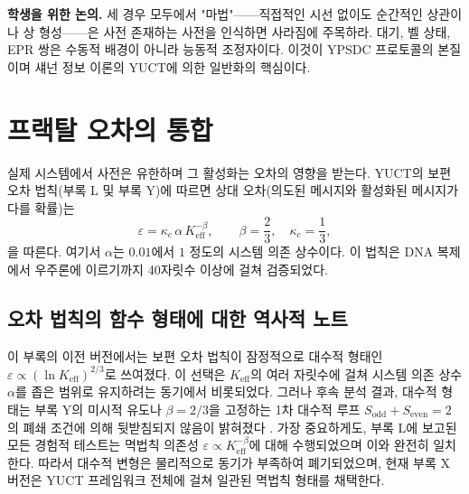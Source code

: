 \documentclass[12pt,a4paper]{article}
\begin{document}
	\vspace{0.2cm}
	\noindent\textbf{학생을 위한 논의.} 
	세 경우 모두에서 "마법"——직접적인 시선 없이도 순간적인 상관이나 상 형성——은 사전 존재하는 사전을 인식하면 사라짐에 주목하라. 대기, 벨 상태, EPR 쌍은 수동적 배경이 아니라 능동적 조정자이다. 이것이 YPSDC 프로토콜의 본질이며 섀넌 정보 이론의 YUCT에 의한 일반화의 핵심이다.
	
	\section{프랙탈 오차의 통합}
	\label{sec:errors}
	
	실제 시스템에서 사전은 유한하며 그 활성화는 오차의 영향을 받는다. YUCT의 보편 오차 법칙(부록 L 및 부록 Y)에 따르면 상대 오차(의도된 메시지와 활성화된 메시지가 다를 확률)는
	\begin{equation}
		\boxed{\varepsilon = \kappa_c \, \alpha \, K_{\mathrm{eff}}^{-\beta}}, \qquad 
		\beta = \frac{2}{3},\quad \kappa_c = \frac{1}{3},
		\label{eq:error-law-corrected}
	\end{equation}
	을 따른다. 여기서 $\alpha$는 $0.01$에서 $1$ 정도의 시스템 의존 상수이다. 이 법칙은 DNA 복제에서 우주론에 이르기까지 40자릿수 이상에 걸쳐 검증되었다.
	
	\subsection*{오차 법칙의 함수 형태에 대한 역사적 노트}
	
	이 부록의 이전 버전에서는 보편 오차 법칙이 잠정적으로 대수적 형태인 $\varepsilon \propto (\ln K_{\mathrm{eff}})^{2/3}$로 쓰여졌다. 이 선택은 $K_{\mathrm{eff}}$의 여러 자릿수에 걸쳐 시스템 의존 상수 $\alpha$를 좁은 범위로 유지하려는 동기에서 비롯되었다. 그러나 후속 분석 결과, 대수적 형태는 부록 Y의 미시적 유도나 $\beta=2/3$을 고정하는 1차 대수적 루프 $S_{\mathrm{odd}}+S_{\mathrm{even}}=2$의 폐쇄 조건에 의해 뒷받침되지 않음이 밝혀졌다 \cite{YakushevLaw2026}. 가장 중요하게도, 부록 L에 보고된 모든 경험적 테스트는 멱법칙 의존성 $\varepsilon \propto K_{\mathrm{eff}}^{-\beta}$에 대해 수행되었으며 이와 완전히 일치한다. 따라서 대수적 변형은 물리적으로 동기가 부족하여 폐기되었으며, 현재 부록 X 버전은 YUCT 프레임워크 전체에 걸쳐 일관된 멱법칙 형태를 채택한다.
	
\end{document}
